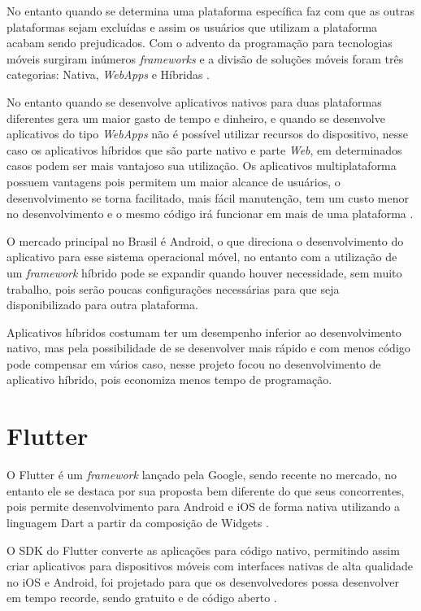 \documentclass{ifto-tex}
\begin{document}
No entanto quando se determina uma plataforma específica faz com que as outras plataformas sejam excluídas e assim os usuários que utilizam a plataforma acabam sendo prejudicados.
Com o advento da programação para tecnologias móveis surgiram inúmeros \textit{frameworks} e a divisão de soluções móveis foram três categorias: Nativa, \textit{WebApps} e Híbridas \cite{Desenvol53:online}.

No entanto quando se desenvolve aplicativos nativos para duas plataformas diferentes gera um maior gasto de tempo e dinheiro, e quando se desenvolve aplicativos do tipo \textit{WebApps} não é possível utilizar recursos do dispositivo, nesse caso os aplicativos híbridos que são parte nativo e parte \textit{Web}, em determinados casos podem ser mais vantajoso sua utilização.
Os aplicativos multiplataforma possuem vantagens pois permitem um maior alcance de usuários, o desenvolvimento se torna facilitado, mais fácil manutenção, tem um custo menor no desenvolvimento e o mesmo código irá funcionar em mais de uma plataforma \cite{Benefits70:online}.

O mercado principal no Brasil é Android, o que direciona o desenvolvimento do aplicativo para esse sistema operacional móvel, no entanto com a utilização de um \textit{framework} híbrido pode se expandir quando houver necessidade, sem muito trabalho, pois serão poucas configurações necessárias para que seja disponibilizado para outra plataforma.

Aplicativos híbridos costumam ter um desempenho inferior ao desenvolvimento nativo, mas pela possibilidade de se desenvolver mais rápido e com menos código pode compensar em vários caso, nesse projeto focou no desenvolvimento de aplicativo híbrido, pois economiza menos tempo de programação.


\section{Flutter}
O Flutter é um \textit{framework} lançado pela Google, sendo recente no mercado, no entanto ele se destaca por sua proposta bem diferente do que seus concorrentes, pois permite desenvolvimento para Android e iOS de forma nativa utilizando a linguagem Dart a partir da composição de Widgets \cite{Conhecen37:online}.

O SDK do Flutter converte as aplicações para código nativo, permitindo assim criar aplicativos para dispositivos móveis com interfaces nativas de alta qualidade no iOS e Android, foi projetado para que os desenvolvedores possa desenvolver em tempo recorde, sendo gratuito e de código aberto \cite{flutterf54:online}.
\end{document}

